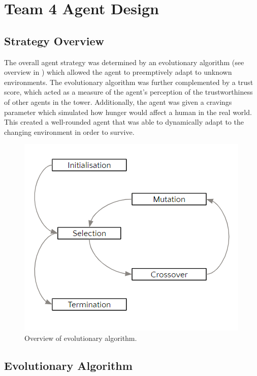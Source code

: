 \chapter{Team 4 Agent Design}\label{team_4_agent_design}

\section{Strategy Overview}
The overall agent strategy was determined by an evolutionary algorithm (see overview in ) which allowed the agent to preemptively adapt to unknown environments. The evolutionary algorithm was further complemented by a trust score, which acted as a measure of the agent's perception of the trustworthiness of other agents in the tower. Additionally, the agent was given a cravings parameter which simulated how hunger would affect a human in the real world. This created a well-rounded agent that was able to dynamically adapt to the changing environment in order to survive. 

\begin{figure}[htb]
    \centering
    \includegraphics{006_team_4_agent_design/assets/evolution_overview.png}
    \caption{Overview of evolutionary algorithm.}
    \label{fig:evolutionOverview}
\end{figure}

\section{Evolutionary Algorithm}

